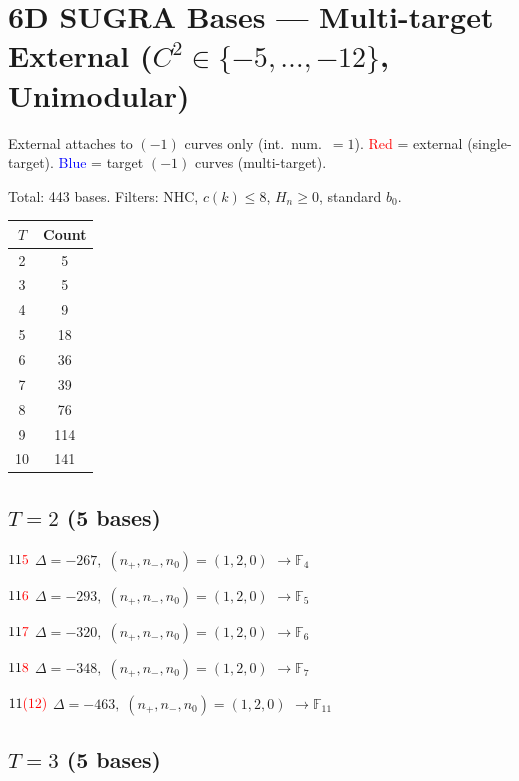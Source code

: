 \documentclass[10pt]{article}
\begin{document}
\section*{6D SUGRA Bases --- Multi-target External ($C^2 \in \{-5,\ldots,-12\}$, Unimodular)}

External attaches to $(-1)$ curves only (int.~num.~$= 1$). \textcolor{red}{Red} = external (single-target). \textcolor{blue}{Blue} = target $(-1)$ curves (multi-target).

Total: 443 bases. Filters: NHC, $c(k) \leq 8$, $H_n \geq 0$, standard $b_0$.

\begin{center}
\begin{tabular}{c|c}
\toprule
$T$ & Count \\
\midrule
2 & 5 \\
3 & 5 \\
4 & 9 \\
5 & 18 \\
6 & 36 \\
7 & 39 \\
8 & 76 \\
9 & 114 \\
10 & 141 \\
\bottomrule
\end{tabular}
\end{center}

\newpage

\subsection*{$T = 2$ \quad (5 bases)}
\smallskip

$11\textcolor{red}{5}$ \quad $\Delta=-267,\; (n_+,n_-,n_0)=(1,2,0)$ \quad $\to \mathbb{F}_{4}$

$11\textcolor{red}{6}$ \quad $\Delta=-293,\; (n_+,n_-,n_0)=(1,2,0)$ \quad $\to \mathbb{F}_{5}$

$11\textcolor{red}{7}$ \quad $\Delta=-320,\; (n_+,n_-,n_0)=(1,2,0)$ \quad $\to \mathbb{F}_{6}$

$11\textcolor{red}{8}$ \quad $\Delta=-348,\; (n_+,n_-,n_0)=(1,2,0)$ \quad $\to \mathbb{F}_{7}$

$11\textcolor{red}{(12)}$ \quad $\Delta=-463,\; (n_+,n_-,n_0)=(1,2,0)$ \quad $\to \mathbb{F}_{11}$


\subsection*{$T = 3$ \quad (5 bases)}
\smallskip
\end{document}
